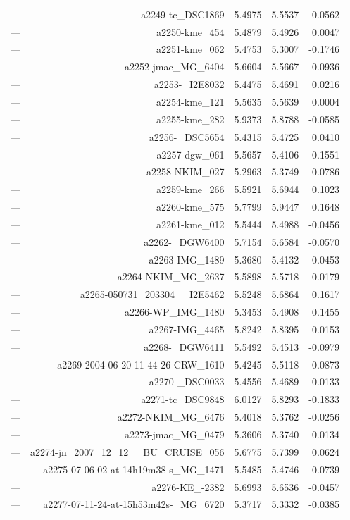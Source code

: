 \begin{table}[htbp]
\begin{tabular}{lrrrr}
— & a2249-tc_DSC1869 & 5.4975 & 5.5537 & 0.0562 \\
— & a2250-kme_454 & 5.4879 & 5.4926 & 0.0047 \\
— & a2251-kme_062 & 5.4753 & 5.3007 & -0.1746 \\
— & a2252-jmac_MG_6404 & 5.6604 & 5.5667 & -0.0936 \\
— & a2253-_I2E8032 & 5.4475 & 5.4691 & 0.0216 \\
— & a2254-kme_121 & 5.5635 & 5.5639 & 0.0004 \\
— & a2255-kme_282 & 5.9373 & 5.8788 & -0.0585 \\
— & a2256-_DSC5654 & 5.4315 & 5.4725 & 0.0410 \\
— & a2257-dgw_061 & 5.5657 & 5.4106 & -0.1551 \\
— & a2258-NKIM_027 & 5.2963 & 5.3749 & 0.0786 \\
— & a2259-kme_266 & 5.5921 & 5.6944 & 0.1023 \\
— & a2260-kme_575 & 5.7799 & 5.9447 & 0.1648 \\
— & a2261-kme_012 & 5.5444 & 5.4988 & -0.0456 \\
— & a2262-_DGW6400 & 5.7154 & 5.6584 & -0.0570 \\
— & a2263-IMG_1489 & 5.3680 & 5.4132 & 0.0453 \\
— & a2264-NKIM_MG_2637 & 5.5898 & 5.5718 & -0.0179 \\
— & a2265-050731_203304__I2E5462 & 5.5248 & 5.6864 & 0.1617 \\
— & a2266-WP_IMG_1480 & 5.3453 & 5.4908 & 0.1455 \\
— & a2267-IMG_4465 & 5.8242 & 5.8395 & 0.0153 \\
— & a2268-_DGW6411 & 5.5492 & 5.4513 & -0.0979 \\
— & a2269-2004-06-20 11-44-26 CRW_1610 & 5.4245 & 5.5118 & 0.0873 \\
— & a2270-_DSC0033 & 5.4556 & 5.4689 & 0.0133 \\
— & a2271-tc_DSC9848 & 6.0127 & 5.8293 & -0.1833 \\
— & a2272-NKIM_MG_6476 & 5.4018 & 5.3762 & -0.0256 \\
— & a2273-jmac_MG_0479 & 5.3606 & 5.3740 & 0.0134 \\
— & a2274-jn_2007_12_12__BU_CRUISE_056 & 5.6775 & 5.7399 & 0.0624 \\
— & a2275-07-06-02-at-14h19m38-s_MG_1471 & 5.5485 & 5.4746 & -0.0739 \\
— & a2276-KE_-2382 & 5.6993 & 5.6536 & -0.0457 \\
— & a2277-07-11-24-at-15h53m42s-_MG_6720 & 5.3717 & 5.3332 & -0.0385 \\

\end{tabular}
\end{table}
